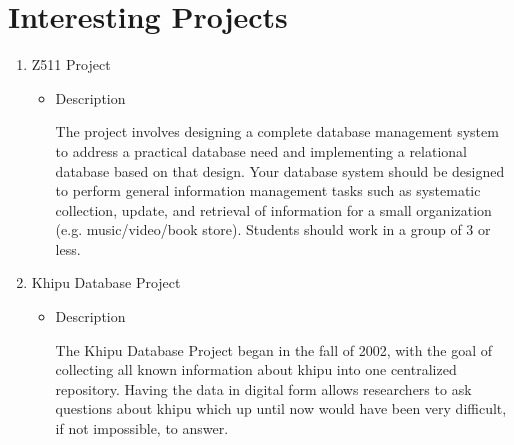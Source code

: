 \documentclass[a4paper]{article}
\begin{document}
\section{Interesting Projects}
\begin{enumerate}
\item  Z511 Project 
\begin{itemize}
\item Description  

The project involves designing a complete database management system to address a practical database need and implementing a relational database based on that design.  Your database system should be designed to perform general information management tasks such as systematic collection, update, and retrieval of information for a small organization (e.g. music/video/book store).  Students should work in a group of 3 or less.
\end{itemize}
\item Khipu Database Project
\begin{itemize}
\item Description


The Khipu Database Project began in the fall of 2002, with the goal of collecting all known information about khipu into one centralized repository. Having the data in digital form allows researchers to ask questions about khipu which up until now would have been very difficult, if not impossible, to answer.
\end{itemize}
\end{enumerate}
\end{document}
